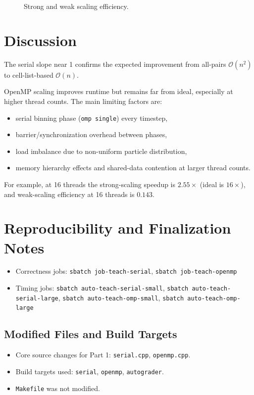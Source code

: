 \documentclass[11pt]{article}
\begin{document}
\begin{figure}[h]
\centering
{}
\caption{Strong and weak scaling efficiency.}
\end{figure}

\section{Discussion}
The serial slope near 1 confirms the expected improvement from all-pairs
\(\mathcal{O}(n^2)\) to cell-list-based \(\mathcal{O}(n)\).

OpenMP scaling improves runtime but remains far from ideal, especially at higher
thread counts. The main limiting factors are:
\begin{itemize}
  \item serial binning phase (\texttt{omp single}) every timestep,
  \item barrier/synchronization overhead between phases,
  \item load imbalance due to non-uniform particle distribution,
  \item memory hierarchy effects and shared-data contention at larger thread counts.
\end{itemize}
For example, at 16 threads the strong-scaling speedup is \(2.55\times\) (ideal
is \(16\times\)), and weak-scaling efficiency at 16 threads is \(0.143\).

\section{Reproducibility and Finalization Notes}
\begin{itemize}
  \item Correctness jobs: \texttt{sbatch job-teach-serial}, \texttt{sbatch job-teach-openmp}
  \item Timing jobs: \texttt{sbatch auto-teach-serial-small}, \texttt{sbatch auto-teach-serial-large},
  \texttt{sbatch auto-teach-omp-small}, \texttt{sbatch auto-teach-omp-large}
\end{itemize}

\subsection{Modified Files and Build Targets}
\begin{itemize}
  \item Core source changes for Part 1: \texttt{serial.cpp}, \texttt{openmp.cpp}.
  \item Build targets used: \texttt{serial}, \texttt{openmp}, \texttt{autograder}.
  \item \texttt{Makefile} was not modified.
\end{itemize}
\end{document}
